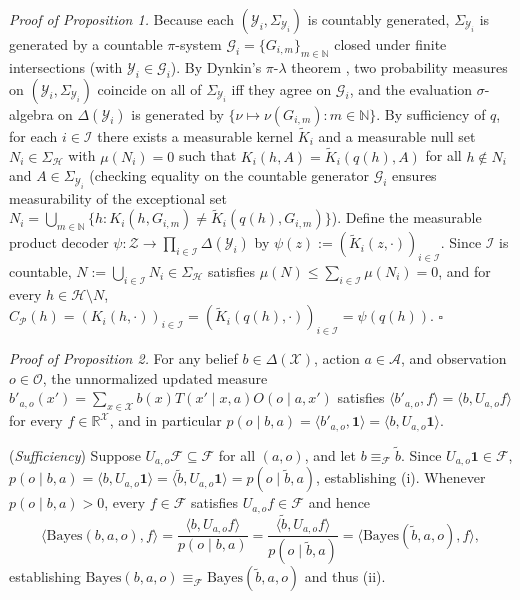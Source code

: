 \documentclass[11pt,letterpaper]{article}
\begin{document}
\emph{Proof of Proposition 1.} Because each
\((\mathcal{Y}_i, \Sigma_{\mathcal{Y}_i})\) is countably generated,
\(\Sigma_{\mathcal{Y}_i}\) is generated by a countable \(\pi\)-system
\(\mathcal{G}_i = \{G_{i,m}\}_{m \in \mathbb{N}}\) closed under finite
intersections (with \(\mathcal{Y}_i \in \mathcal{G}_i\)). By Dynkin's
\(\pi\)-\(\lambda\) theorem \citep{kallenberg2021}, two probability
measures on \((\mathcal{Y}_i, \Sigma_{\mathcal{Y}_i})\) coincide on all
of \(\Sigma_{\mathcal{Y}_i}\) iff they agree on \(\mathcal{G}_i\), and
the evaluation \(\sigma\)-algebra on \(\Delta(\mathcal{Y}_i)\) is
generated by \(\{ \nu \mapsto \nu(G_{i,m}) : m \in \mathbb{N}\}\). By
sufficiency of \(q\), for each \(i \in \mathcal{I}\) there exists a
measurable kernel \(\widetilde{K}_i\) and a measurable null set
\(N_i \in \Sigma_{\mathcal{H}}\) with \(\mu(N_i) = 0\) such that
\(K_i(h, A) = \widetilde{K}_i(q(h), A)\) for all \(h \notin N_i\) and
\(A \in \Sigma_{\mathcal{Y}_i}\) (checking equality on the countable
generator \(\mathcal{G}_i\) ensures measurability of the exceptional set
\(N_i = \bigcup_{m \in \mathbb{N}} \{h : K_i(h, G_{i,m}) \neq \widetilde{K}_i(q(h), G_{i,m})\}\)).
Define the measurable product decoder
\(\psi: \mathcal{Z} \to \prod_{i \in \mathcal{I}} \Delta(\mathcal{Y}_i)\)
by \(\psi(z) := (\widetilde{K}_i(z, \cdot))_{i \in \mathcal{I}}\). Since
\(\mathcal{I}\) is countable,
\(N := \bigcup_{i \in \mathcal{I}} N_i \in \Sigma_{\mathcal{H}}\)
satisfies \(\mu(N) \le \sum_{i \in \mathcal{I}} \mu(N_i) = 0\), and for
every \(h \in \mathcal{H} \setminus N\),
\(C_{\mathcal{P}}(h) = (K_i(h,\cdot))_{i \in \mathcal{I}} = (\widetilde{K}_i(q(h),\cdot))_{i \in \mathcal{I}} = \psi(q(h))\).
\(\square\)

\emph{Proof of Proposition 2.} For any belief
\(b \in \Delta(\mathcal{X})\), action \(a \in \mathcal{A}\), and
observation \(o \in \mathcal{O}\), the unnormalized updated measure
\(b'_{a,o}(x') = \sum_{x \in \mathcal{X}} b(x) T(x' \mid x,a) O(o \mid a,x')\)
satisfies \(\langle b'_{a,o}, f\rangle = \langle b, U_{a,o} f\rangle\)
for every \(f \in \mathbb{R}^{\mathcal{X}}\), and in particular
\(p(o \mid b, a) = \langle b'_{a,o}, \mathbf{1}\rangle = \langle b, U_{a,o}\mathbf{1}\rangle\).

(\emph{Sufficiency}) Suppose
\(U_{a,o}\mathcal{F} \subseteq \mathcal{F}\) for all \((a,o)\), and let
\(b \equiv_{\mathcal{F}} \tilde{b}\). Since
\(U_{a,o}\mathbf{1} \in \mathcal{F}\),
\(p(o \mid b, a) = \langle b, U_{a,o}\mathbf{1}\rangle = \langle \tilde{b}, U_{a,o}\mathbf{1}\rangle = p(o \mid \tilde{b}, a)\),
establishing (i). Whenever \(p(o \mid b,a) > 0\), every
\(f \in \mathcal{F}\) satisfies \(U_{a,o}f \in \mathcal{F}\) and hence
\[\langle \mathrm{Bayes}(b,a,o), f\rangle = \frac{\langle b, U_{a,o}f\rangle}{p(o \mid b,a)} = \frac{\langle \tilde{b}, U_{a,o}f\rangle}{p(o \mid \tilde{b},a)} = \langle \mathrm{Bayes}(\tilde{b},a,o), f\rangle,\]
establishing
\(\mathrm{Bayes}(b,a,o) \equiv_{\mathcal{F}} \mathrm{Bayes}(\tilde{b},a,o)\)
and thus (ii).
\end{document}
